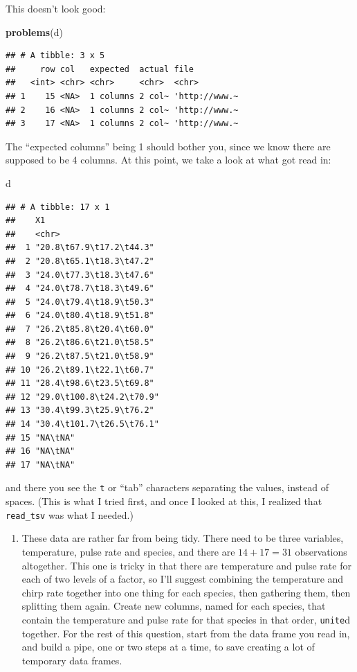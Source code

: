\documentclass[]{tufte-book}
\newenvironment{Shaded}{}{}
\newcommand{\KeywordTok}[1]{\textcolor[rgb]{0.00,0.44,0.13}{\textbf{#1}}}
\newcommand{\NormalTok}[1]{#1}
\providecommand{\tightlist}{%
  \setlength{\itemsep}{0pt}\setlength{\parskip}{0pt}}
\theoremstyle{definition}
\theoremstyle{definition}
\theoremstyle{definition}
\theoremstyle{remark}
\begin{document}
This doesn't look good:

\begin{Shaded}
\begin{Highlighting}[]
\KeywordTok{problems}\NormalTok{(d)}
\end{Highlighting}
\end{Shaded}

\begin{verbatim}
## # A tibble: 3 x 5
##     row col   expected  actual file         
##   <int> <chr> <chr>     <chr>  <chr>        
## 1    15 <NA>  1 columns 2 col~ 'http://www.~
## 2    16 <NA>  1 columns 2 col~ 'http://www.~
## 3    17 <NA>  1 columns 2 col~ 'http://www.~
\end{verbatim}

The ``expected columns'' being 1 should bother you, since we know there
are supposed to be 4 columns. At this point, we take a look at what got
read in:

\begin{Shaded}
\begin{Highlighting}[]
\NormalTok{d}
\end{Highlighting}
\end{Shaded}

\begin{verbatim}
## # A tibble: 17 x 1
##    X1                       
##    <chr>                    
##  1 "20.8\t67.9\t17.2\t44.3" 
##  2 "20.8\t65.1\t18.3\t47.2" 
##  3 "24.0\t77.3\t18.3\t47.6" 
##  4 "24.0\t78.7\t18.3\t49.6" 
##  5 "24.0\t79.4\t18.9\t50.3" 
##  6 "24.0\t80.4\t18.9\t51.8" 
##  7 "26.2\t85.8\t20.4\t60.0" 
##  8 "26.2\t86.6\t21.0\t58.5" 
##  9 "26.2\t87.5\t21.0\t58.9" 
## 10 "26.2\t89.1\t22.1\t60.7" 
## 11 "28.4\t98.6\t23.5\t69.8" 
## 12 "29.0\t100.8\t24.2\t70.9"
## 13 "30.4\t99.3\t25.9\t76.2" 
## 14 "30.4\t101.7\t26.5\t76.1"
## 15 "NA\tNA"                 
## 16 "NA\tNA"                 
## 17 "NA\tNA"
\end{verbatim}

and there you see the \texttt{t} or ``tab'' characters separating the
values, instead of spaces. (This is what I tried first, and once I
looked at this, I realized that \texttt{read\_tsv} was what I needed.)

\begin{enumerate}
\def\labelenumi{(\alph{enumi})}
\setcounter{enumi}{1}
\tightlist
\item
  These data are rather far from being tidy. There need to be three
  variables, temperature, pulse rate and species, and there are
  \(14+17=31\) observations altogether. This one is tricky in that there
  are temperature and pulse rate for each of two levels of a factor, so
  I'll suggest combining the temperature and chirp rate together into
  one thing for each species, then gathering them, then splitting them
  again. Create new columns, named for each species, that contain the
  temperature and pulse rate for that species in that order,
  \texttt{unite}d together. For the rest of this question, start from
  the data frame you read in, and build a pipe, one or two steps at a
  time, to save creating a lot of temporary data frames.
\end{enumerate}
\end{document}

